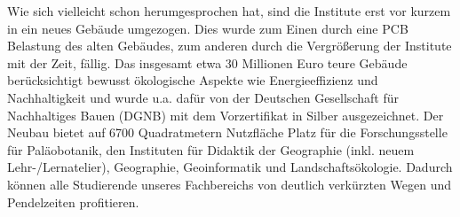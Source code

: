 Wie sich vielleicht schon herumgesprochen hat, sind die Institute erst vor kurzem in ein neues Gebäude umgezogen. Dies wurde zum Einen durch eine PCB Belastung des alten Gebäudes, zum anderen durch die Vergrößerung der Institute mit der Zeit, fällig. Das insgesamt etwa 30 Millionen Euro teure Gebäude berücksichtigt bewusst ökologische Aspekte wie Energieeffizienz und Nachhaltigkeit und wurde u.a. dafür von der Deutschen Gesellschaft für Nachhaltiges Bauen (DGNB) mit dem Vorzertifikat in Silber ausgezeichnet. Der Neubau bietet auf 6700 Quadratmetern Nutzfläche Platz für die Forschungsstelle für Paläobotanik, den Instituten für Didaktik der Geographie (inkl. neuem Lehr-/Lernatelier), Geographie, Geoinformatik und Landschaftsökologie. Dadurch können alle Studierende unseres Fachbereichs von deutlich verkürzten Wegen und Pendelzeiten profitieren.


